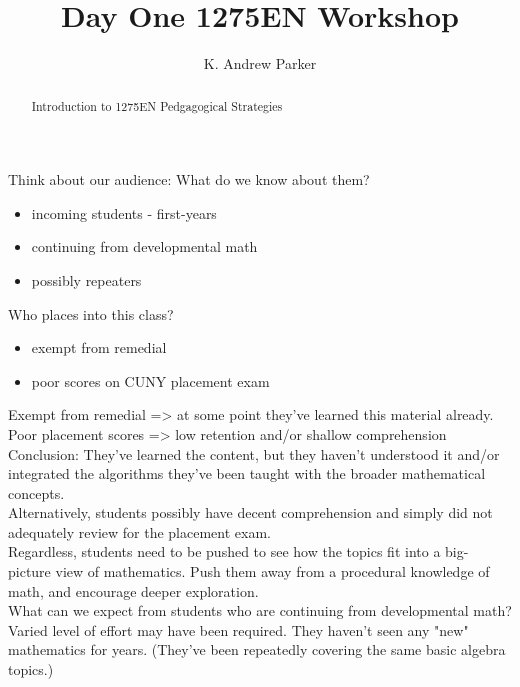 \documentclass{ximera}
\title{Day One 1275EN Workshop}
\author{K. Andrew Parker}
\begin{document}
\begin{abstract}
Introduction to 1275EN Pedgagogical Strategies
\end{abstract}

\maketitle

Think about our audience: What do we know about them?
\begin{itemize}
\item incoming students - first-years
\item continuing from developmental math
\item possibly repeaters
\end{itemize}

Who places into this class?
\begin{itemize}
\item exempt from remedial
\item poor scores on CUNY placement exam
\end{itemize}

Exempt from remedial => at some point they've learned this material already. \\

Poor placement scores => low retention and/or shallow comprehension \\

Conclusion: They've learned the content, but they haven't understood it
and/or integrated the algorithms they've been taught with the broader
mathematical concepts.\\

Alternatively, students possibly have decent comprehension and simply did not 
adequately review for the placement exam. \\

Regardless, students need to be pushed to see how the topics fit into a big-
picture view of mathematics. Push them away from a procedural knowledge of
math, and encourage deeper exploration.\\


What can we expect from students who are continuing from developmental math? \\

Varied level of effort may have been required. They haven't seen any "new" 
mathematics for years. (They've been repeatedly covering the same basic algebra
topics.)\\
\end{document}
